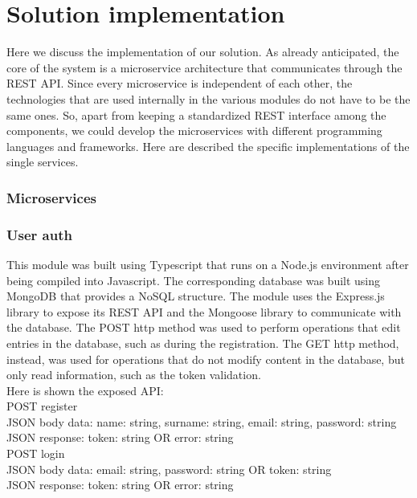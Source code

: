 \section{Solution implementation}
Here we discuss the implementation of our solution. As already anticipated,
the core of the system is a microservice architecture that communicates
through the REST API. Since every microservice is independent of each
other, the technologies that are used internally in the various modules
do not have to be the same ones. So, apart from keeping a standardized REST
interface among the components, we could develop the microservices with
different programming languages and frameworks. Here are described the
specific implementations of the single services.

\subsubsection{Microservices}


\subsubsection{User auth}

This module was built using Typescript that runs on a Node.js environment after
being compiled into Javascript. The corresponding database was built using MongoDB
that provides a NoSQL structure. The module uses the Express.js library to expose
its REST API and the Mongoose library to communicate with the database. The POST http
method was used to perform operations that edit entries in the database, such as
during the registration. The GET http method, instead, was used for operations that
do not modify content in the database, but only read information, such as the token
validation.\\

Here is shown the exposed API:\\



POST register\\
JSON body data: name: string, surname: string, email: string, password: string\\
JSON response: token: string OR error: string\\

POST login\\
JSON body data: email: string, password: string OR token: string\\
JSON response: token: string OR error: string\\

